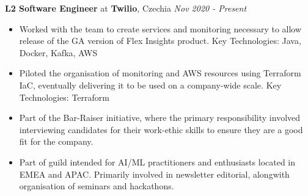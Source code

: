 
{\textbf{L2 Software Engineer} at \textbf{Twilio}, Czechia} 
    \hfill {\em Nov 2020 - Present}
    \begin{itemize}
        \item Worked with the team to create services and monitoring necessary to allow release of the GA version of Flex Insights product. Key Technologies: Java, Docker, Kafka, AWS
        \item Piloted the organisation of monitoring and AWS resources using Terraform IaC, eventually delivering it to be used on a company-wide scale. Key Technologies: Terraform
        \item Part of the Bar-Raiser initiative, where the primary responsibility involved interviewing candidates for their work-ethic skills to ensure they are a good fit for the company.
        \item Part of guild intended for AI/ML practitioners and enthusiasts located in EMEA and APAC. Primarily involved in newsletter editorial, alongwith organisation of seminars and hackathons.
    \end{itemize}